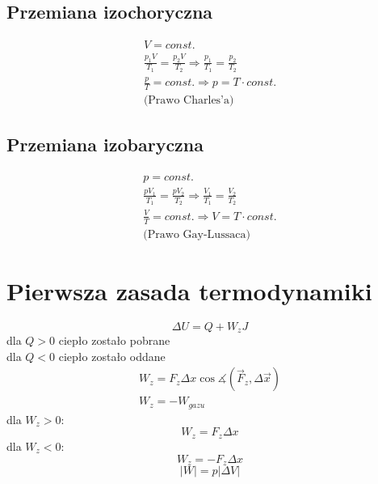       \subsection{Przemiana izochoryczna}
        \begin{gather}
          V = const.\\
          \frac{p_1V}{T_1} = \frac{p_2V}{T_2} \Rightarrow \frac{p_1}{T_1} = \frac{p_2}{T_2}\\
          \frac{p}{T} = const. \Rightarrow p = T\cdot const.\\\text{(Prawo Charles'a)}
        \end{gather}
      \subsection{Przemiana izobaryczna}
        \begin{gather}
          p = const.\\
          \frac{pV_1}{T_1} = \frac{pV_2}{T_2} \Rightarrow \frac{V_1}{T_1} = \frac{V_2}{T_2}\\
          \frac{V}{T} = const. \Rightarrow V = T\cdot const.\\
          \text{(Prawo Gay-Lussaca)}
        \end{gather}
    \section{Pierwsza zasada termodynamiki}
      \begin{equation}
        \Delta U = Q + W_z \unit{J}
      \end{equation}
      dla $Q > 0$ ciepło zostało pobrane\\
      dla $Q < 0$ ciepło zostało oddane
      \begin{gather}
        W_z = F_z\Delta x\cos\measuredangle(\vec F_z, \Delta\vec x)\\
        W_z = -W_{gazu}
      \end{gather}
      dla $W_z > 0$:
      \begin{equation}
        W_z = F_z\Delta x
      \end{equation}
      dla $W_z < 0$:
      \begin{equation}
        W_z = -F_z\Delta x
      \end{equation}
      \begin{equation}
        |W| = p|\Delta V|
      \end{equation}
